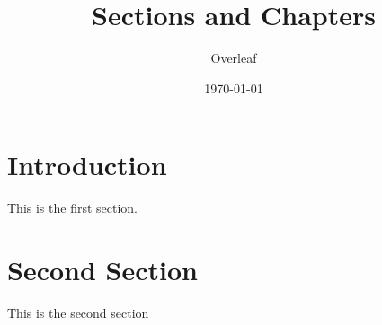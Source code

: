 \documentclass{article}
\title{Sections and Chapters}
\author{Overleaf}
\date{\today}
\begin{document}
\maketitle
\section{Introduction}

This is the first section.

\blindtext

\section{Second Section}
This is the second section

\blindtext
\end{document}
